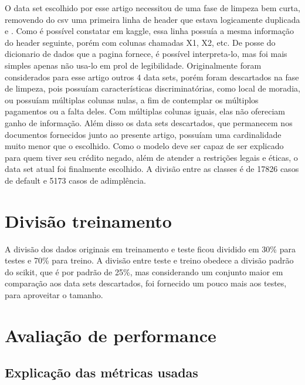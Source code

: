 \documentclass[12pt]{article}
\begin{document}
O data set escolhido por esse artigo\cite{dataset} necessitou de uma fase de limpeza bem curta, removendo do csv uma primeira linha de header que estava logicamente duplicada e . Como é possível constatar em kaggle\cite{kaggle}, essa linha possuía a mesma informação do header seguinte, porém com colunas chamadas X1, X2, etc. De posse do dicionario de dados que a pagina fornece, é possível interpreta-lo, mas foi mais simples apenas não usa-lo em prol de legibilidade. Originalmente foram considerados para esse artigo outros 4 data sets, porém foram descartados na fase de limpeza, pois possuíam características discriminatórias, como local de moradia, ou possuíam múltiplas colunas nulas, a fim de contemplar os múltiplos pagamentos ou a falta deles. Com múltiplas colunas iguais, elas não ofereciam ganho de informação. Além disso os data sets descartados, que permanecem nos documentos fornecidos junto ao presente artigo, possuíam uma cardinalidade muito menor que o escolhido. Como o modelo deve ser capaz de ser explicado para quem tiver seu crédito negado, além de atender a restrições legais e éticas, o data set atual foi finalmente escolhido. A divisão entre as classes é de 17826 casos de default e 5173 casos de adimplência.

\section{Divisão treinamento}

A divisão dos dados originais em treinamento e teste ficou dividido em 30\% para testes e 70\% para treino. A divisão entre teste e treino obedece a divisão padrão do scikit, que é por padrão de 25\%, mas considerando um conjunto maior em comparação aos data sets descartados, foi fornecido um pouco mais aos testes, para aproveitar o tamanho.

\section{Avaliação de performance}
\subsection{Explicação das métricas usadas}
\end{document}
